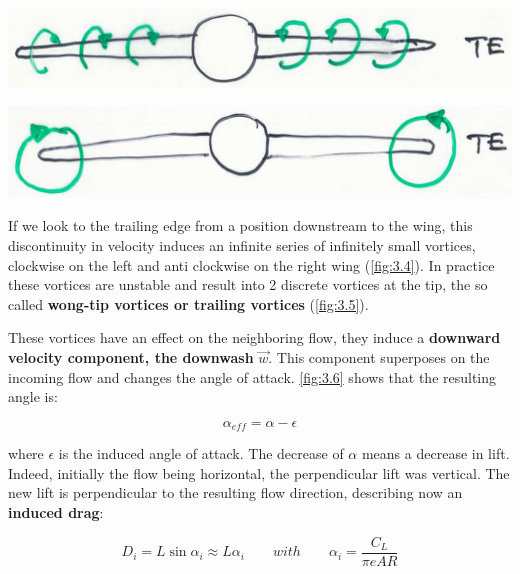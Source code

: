 	\begin{center}
	\begin{minipage}{0.4\textwidth}
	\includegraphics[scale=0.1]{ch3/4}
	\label{fig:3.4}
	\end{minipage}
	\begin{minipage}{0.4\textwidth}
	\includegraphics[scale=0.1]{ch3/5}
	\label{fig:3.5}
	\end{minipage}
	\end{center}
	
	If we look to the trailing edge from a position downstream to the wing, this discontinuity in velocity induces an infinite series of infinitely small vortices, clockwise on the left and anti clockwise on the right wing (\autoref{fig:3.4}). In practice these vortices are unstable and result into 2 discrete vortices at the tip, the so called \textbf{wong-tip vortices or trailing vortices} (\autoref{fig:3.5}). 
	
	These vortices have an effect on the neighboring flow, they induce a \textbf{downward velocity component, the downwash} $\vec{w}$. This component superposes on the incoming flow and changes the angle of attack. \autoref{fig:3.6} shows that the resulting angle is: 
	
	\begin{equation}
	\alpha _{eff} = \alpha - \epsilon
	\end{equation}
	
	where $\epsilon$ is the induced angle of attack. The decrease of $\alpha$ means a decrease in lift. Indeed, initially the flow being horizontal, the perpendicular lift was vertical. The new lift is perpendicular to the resulting flow direction, describing now an \textbf{induced drag}: 
	
	\begin{equation}
	D_i = L \sin \alpha _i \approx L\alpha _i \qquad with \qquad \alpha _i = \frac{C_L}{\pi e AR} 
	\label{eq:3.2}
	\end{equation}
	
